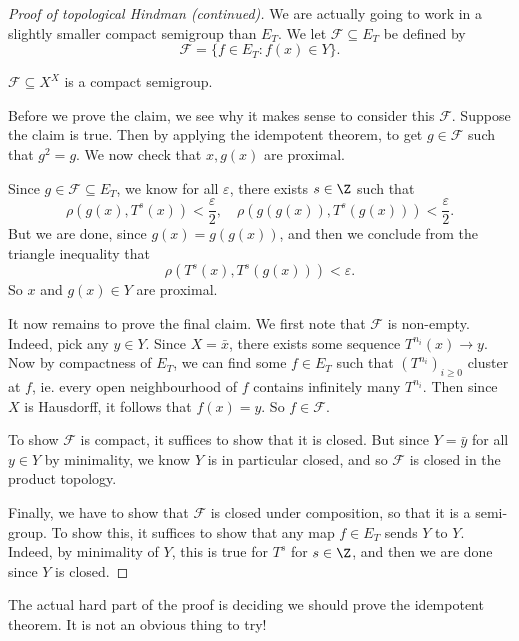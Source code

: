 \documentclass[a4paper]{article}
\begin{document}
\begin{proof}[Proof of topological Hindman (continued)]
  We are actually going to work in a slightly smaller compact semigroup than $E_T$. We let $\mathcal{F} \subseteq E_T$ be defined by
  \[
    \mathcal{F} = \{f \in E_T: f(x) \in Y\}.
  \]
  \begin{claim}
    $\mathcal{F} \subseteq X^X$ is a compact semigroup.
  \end{claim}
  Before we prove the claim, we see why it makes sense to consider this $\mathcal{F}$. Suppose the claim is true. Then by applying the idempotent theorem, to get $g \in \mathcal{F}$ such that $g^2 = g$. We now check that $x, g(x)$ are proximal.

  Since $g \in \mathcal{F} \subseteq E_T$, we know for all $\varepsilon$, there exists $s \in \Z$ such that
  \[
    \rho(g(x), T^s(x)) < \frac{\varepsilon}{2},\quad \rho(g(g(x)), T^s(g(x))) < \frac{\varepsilon}{2}.
  \]
  But we are done, since $g(x) = g(g(x))$, and then we conclude from the triangle inequality that
  \[
    \rho(T^s(x), T^s(g(x))) < \varepsilon.
  \]
  So $x$ and $g(x) \in Y$ are proximal.

  It now remains to prove the final claim. We first note that $\mathcal{F}$ is non-empty. Indeed, pick any $y \in Y$. Since $X = \bar{x}$, there exists some sequence $T^{n_i}(x) \to y$. Now by compactness of $E_T$, we can find some $f \in E_T$ such that $(T^{n_i})_{i \geq 0}$ cluster at $f$, ie. every open neighbourhood of $f$ contains infinitely many $T^{n_i}$. Then since $X$ is Hausdorff, it follows that $f(x) = y$. So $f \in \mathcal{F}$.

  To show $\mathcal{F}$ is compact, it suffices to show that it is closed. But since $Y = \bar{y}$ for all $y \in Y$ by minimality, we know $Y$ is in particular closed, and so $\mathcal{F}$ is closed in the product topology.

  Finally, we have to show that $\mathcal{F}$ is closed under composition, so that it is a semi-group. To show this, it suffices to show that any map $f \in E_T$ sends $Y$ to $Y$. Indeed, by minimality of $Y$, this is true for $T^s$ for $s \in \Z$, and then we are done since $Y$ is closed.
\end{proof}
The actual hard part of the proof is deciding we should prove the idempotent theorem. It is not an obvious thing to try!
\end{document}
